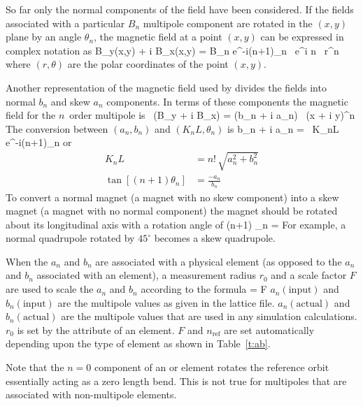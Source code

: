 So far only the normal components of the field have been
considered. If the fields associated with a particular $B_n$ multipole
component are rotated in the $(x, y)$ plane by an angle $\theta_n$, the
magnetic field at a point $(x,y)$ can be expressed in complex notation
as
\Begineq
  B_y(x,y) + i B_x(x,y) = 
     B_n e^{-i(n+1)\theta_n} \, e^{i n \theta} \, r^n 
  \label{bib1nb}
\Endeq
where $(r, \theta)$ are the polar coordinates of the point $(x, y)$.

Another representation of the magnetic field used by \bmad divides
the fields into normal $b_n$ and skew $a_n$ components. In terms of
these components the magnetic field for the $n$\Th\ order multipole is
\Begineq
   \, (B_y + i B_x) = (b_n + i a_n) \, (x + i y)^n
\Endeq
The conversion between $(a_n, b_n)$ and $(K_nL, \theta_n)$ is
\Begineq
  b_n + i a_n =  \, K_nL \, e^{-i(n+1)\theta_n}
\Endeq
or
\begin{align}
  K_n L &= n! \, \sqrt{a_n^2 + b_n^2} \\
  \tan[(n+1) \theta_n] &= \frac{-a_n}{b_n}
\end{align}
To convert a normal magnet (a magnet with no skew component) into a skew
magnet (a magnet with no normal component) the magnet should be rotated
about its longitudinal axis with a rotation angle of
\Begineq
  (n+1) \theta_n = 
\Endeq
For example, a normal quadrupole rotated by $45^\circ$ becomes a
skew quadrupole.

When the $a_n$ and $b_n$ are associated with a physical element (as
opposed to the $a_n$ and $b_n$ associated with an  element),
a measurement radius $r_0$ and a scale factor $F$ are used to scale
the $a_n$ and $b_n$ according to the formula
\Begineq
   =
  \cdot F \cdot {} 
  \label{ababf}
\Endeq
$a_n(\text{input})$ and $b_n(\text{input})$ are the multipole values as given in the
lattice file. $a_n(\text{actual})$ and $b_n(\text{actual})$ are the multipole values
that are used in any simulation calculations. $r_0$ is set by the
 attribute of an element. $F$ and $n_\text{ref}$ are set
automatically depending upon the type of element as shown in
Table~\ref{t:ab}.

Note that the $n = 0$ component of an  or 
element rotates the reference orbit essentially acting as a zero length bend.
This is not true for multipoles that are associated with 
non-multipole elements.

